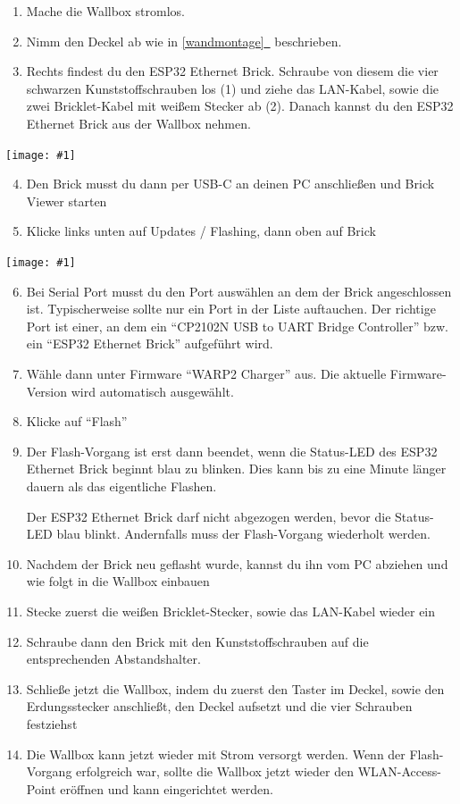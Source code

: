 \documentclass[a4paper,10pt]{article}
\newcommand{\hint}[1]{\begin{tcolorbox}[colback=boxgray,colframe=black,coltext=
white,title=Hinweis,left*=2mm,right*=2mm,boxsep=1mm,bottom=1mm,top=1mm]#1\end{tcolorbox}}
\newcommand{\gfx}[1]{\texttt{[image: \#1]}}
\newcommand*{\fullref}[1]{\hyperref[{#1}]{\ref*{#1}~\nameref*{#1}}}
\begin{document}
\begin{multicols*}{2}
	\columnbreak
	\begin{enumerate}
		\item Mache die Wallbox stromlos.
		\item Nimm den Deckel ab wie in \fullref{wandmontage} beschrieben.
		\item Rechts findest du den ESP32 Ethernet Brick. Schraube von diesem die vier schwarzen Kunststoffschrauben los (1) und ziehe das LAN-Kabel, sowie die zwei Bricklet-Kabel mit weißem Stecker
		ab (2). Danach kannst du den ESP32 Ethernet Brick aus der Wallbox nehmen.
	\end{enumerate}
	\gfx{./img_warp2/resized/warp_factory_reset_cropped}
	\begin{enumerate}
		\setcounter{enumi}{3}
		\item Den Brick musst du dann per USB-C an deinen PC anschließen und Brick Viewer starten
		\item Klicke links unten auf Updates / Flashing, dann oben auf Brick
	\end{enumerate}
	\gfx{./img_warp2/resized/warp_factory_flash}
	\begin{enumerate}
		\setcounter{enumi}{5}
		\item Bei Serial Port musst du den Port auswählen an dem der Brick angeschlossen ist.
		      Typischerweise sollte nur ein Port in der Liste auftauchen.
		      Der richtige Port ist einer, an dem ein \enquote{CP2102N USB to UART Bridge Controller} bzw. ein \enquote{ESP32 Ethernet Brick} aufgeführt wird.
		\item Wähle dann unter Firmware \enquote{WARP2 Charger} aus. Die aktuelle Firmware-Version wird automatisch ausgewählt.
		\item Klicke auf \enquote{Flash}
		\item Der Flash-Vorgang ist erst dann beendet, wenn die Status-LED des ESP32 Ethernet Brick beginnt blau zu blinken. Dies kann bis zu eine Minute länger dauern als das eigentliche Flashen.
		\hint{Der ESP32 Ethernet Brick darf nicht abgezogen werden, bevor die Status-LED blau blinkt. Andernfalls muss der Flash-Vorgang wiederholt werden.}
		\item Nachdem der Brick neu geflasht wurde, kannst du ihn vom PC abziehen und wie folgt in die Wallbox einbauen
		\item Stecke zuerst die weißen Bricklet-Stecker, sowie das LAN-Kabel wieder ein
		\item Schraube dann den Brick mit den Kunststoffschrauben auf die entsprechenden Abstandshalter.
		\item Schließe jetzt die Wallbox, indem du zuerst den Taster im Deckel, sowie den Erdungsstecker anschließt, den Deckel aufsetzt und die vier Schrauben festziehst
		\item Die Wallbox kann jetzt wieder mit Strom versorgt werden. Wenn der Flash-Vorgang erfolgreich war, sollte die Wallbox jetzt wieder den WLAN-Access-Point eröffnen und kann eingerichtet werden.
	\end{enumerate}


\end{multicols*}
\end{document}
